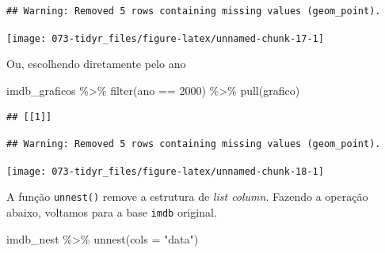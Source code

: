 \documentclass[
]{book}
\newenvironment{Shaded}{\begin{snugshade}}{\end{snugshade}}
\newcommand{\AttributeTok}[1]{\textcolor[rgb]{0.77,0.63,0.00}{#1}}
\newcommand{\DecValTok}[1]{\textcolor[rgb]{0.00,0.00,0.81}{#1}}
\newcommand{\FunctionTok}[1]{\textcolor[rgb]{0.00,0.00,0.00}{#1}}
\newcommand{\NormalTok}[1]{#1}
\newcommand{\SpecialCharTok}[1]{\textcolor[rgb]{0.00,0.00,0.00}{#1}}
\newcommand{\StringTok}[1]{\textcolor[rgb]{0.31,0.60,0.02}{#1}}
\begin{document}
\begin{verbatim}
## Warning: Removed 5 rows containing missing values (geom_point).
\end{verbatim}

\begin{center}\texttt{[image: 073-tidyr\_files/figure-latex/unnamed-chunk-17-1]} \end{center}

Ou, escolhendo diretamente pelo ano

\begin{Shaded}
\begin{Highlighting}[]
\NormalTok{imdb\_graficos }\SpecialCharTok{\%\textgreater{}\%} 
  \FunctionTok{filter}\NormalTok{(ano }\SpecialCharTok{==} \DecValTok{2000}\NormalTok{) }\SpecialCharTok{\%\textgreater{}\%} 
  \FunctionTok{pull}\NormalTok{(grafico)}
\end{Highlighting}
\end{Shaded}

\begin{verbatim}
## [[1]]
\end{verbatim}

\begin{verbatim}
## Warning: Removed 5 rows containing missing values (geom_point).
\end{verbatim}

\begin{center}\texttt{[image: 073-tidyr\_files/figure-latex/unnamed-chunk-18-1]} \end{center}

A função \texttt{unnest()} remove a estrutura de \emph{list column}. Fazendo a operação abaixo, voltamos para a base \texttt{imdb} original.

\begin{Shaded}
\begin{Highlighting}[]
\NormalTok{imdb\_nest }\SpecialCharTok{\%\textgreater{}\%}
  \FunctionTok{unnest}\NormalTok{(}\AttributeTok{cols =} \StringTok{"data"}\NormalTok{)}
\end{Highlighting}
\end{Shaded}
\end{document}
